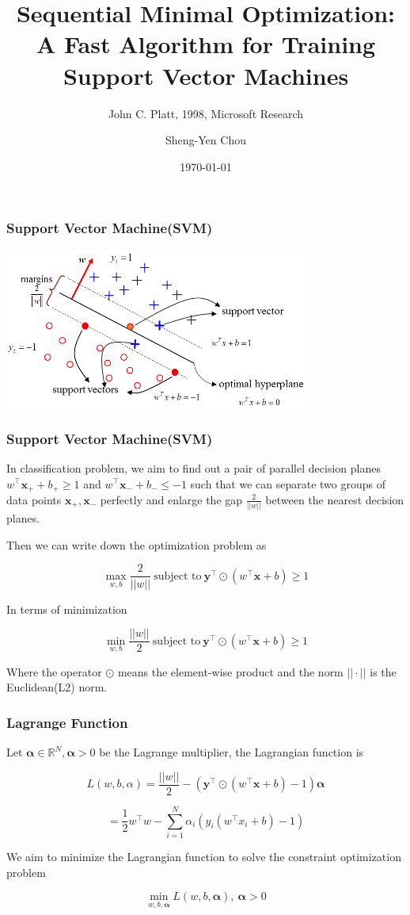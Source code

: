 \documentclass[xcolor=pdftex,dvipsnames,table,handout]{beamer}
\title[Sequential Minimal Optimization]{Sequential Minimal Optimization: A Fast Algorithm for Training Support Vector Machines}
\subtitle{John C. Platt, 1998, Microsoft Research}
\author[SY Chou]{Sheng-Yen Chou}
\institute[NTHU CS]{Department of Computer Science\\ 
National Tsing Hua University}
\date{\today}
\begin{document}
\begin{frame}
  \titlepage
\end{frame}

\begin{frame}  
\frametitle{Support Vector Machine(SVM)}
\begin{center}
    \includegraphics[width=4in]{./imgs/svm.png}
\end{center}
\end{frame}

\begin{frame}  
\frametitle{Support Vector Machine(SVM)}
In classification problem, we aim to find out a pair of parallel decision planes $w^{\top} \mathbf{x}_{+} + b_{+} \geq 1$ and $w^{\top} \mathbf{x}_{-} + b_{-} \leq -1$ such that we can separate two groups of data points $\mathbf{x}_{+}, \mathbf{x}_{-}$ perfectly and enlarge the gap $\frac{2}{||w||}$ between the nearest decision planes. 

Then we can write down the optimization problem as 

\begin{equation}
\label{eqn:einstein}
\max_{w, b} \frac{2}{||w||} \ \text{subject to} \ \mathbf{y}^{\top} \odot (w^{\top} \mathbf{x} + b) \geq 1
\end{equation}

In terms of minimization

\begin{equation}
\label{eqn:einstein}
\min_{w, b} \frac{||w||}{2} \ \text{subject to} \ \mathbf{y}^{\top} \odot (w^{\top} \mathbf{x} + b) \geq 1
\end{equation}

Where the operator $\odot$ means the element-wise product and the norm $|| \cdot ||$ is the Euclidean(L2) norm.

\end{frame}

\begin{frame}  
\frametitle{Lagrange Function}
Let $\mathbf{\alpha} \in \mathbb{R}^N, \mathbf{\alpha} > 0$ be the Lagrange multiplier, the Lagrangian function is 

$$
L(w, b, \alpha) = \frac{||w||}{2} -  (\mathbf{y}^{\top} \odot (w^{\top} \mathbf{x} + b) - 1) \mathbf{\alpha}
$$

$$
= \frac{1}{2} w^{\top} w - \sum_{i=1}^{N} \alpha_i (y_i (w^{\top} x_i + b) - 1)
$$

We aim to minimize the Lagrangian function to solve the constraint optimization problem

$$
\min_{w, b, \mathbf{\alpha}} L(w, b, \mathbf{\alpha}), \ \mathbf{\alpha} > 0
$$
\end{frame}
\end{document}
